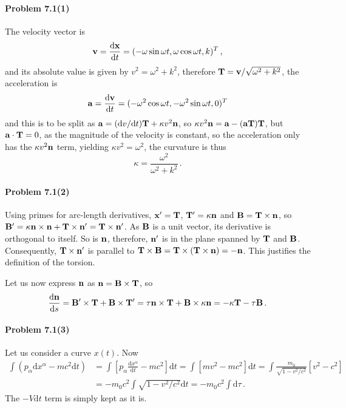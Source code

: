 \documentclass[a4paper,12pt]{article}
\def\d{\mathrm{d}}
\newcommand{\problem}[1]{\paragraph{Problem #1}}
\begin{document}

\problem{7.1(1)} The velocity vector is
\[
 {\bf v} = \frac{\d\bf x}{\d t} = (-\omega\sin\omega t, \omega\cos\omega t, k)^T\,,
\]
and its absolute value is given by $v^2 = \omega^2 + k^2$, therefore ${\bf T} = {\bf v}/\sqrt{\omega^2+k^2}$, the acceleration is
\[
 {\bf a} = \frac{\d\bf v}{\d t} = (-\omega^2\cos\omega t, -\omega^2 \sin\omega t, 0)^T
\]
and this is to be split as ${\bf a} = (\d v/\d t){\bf T} + \kappa v^2 {\bf n}$, so $\kappa v^2 {\bf n} = {\bf a} - ({\bf a}{\bf T}){\bf T}$, but ${\bf a}\cdot{\bf T} =0$, as the magnitude of the velocity is constant, so the acceleration only has the $\kappa v^2 {\bf n}$ term,
yielding $\kappa v^2=\omega^2$, the curvature is thus
\[
 \kappa = \frac{\omega^2}{\omega^2 + k^2}\,.
\]


\problem{7.1(2)} Using primes for arc-length derivatives,
${\bf x}' = {\bf T}$, ${\bf T}'=\kappa {\bf n}$ and
${\bf B} = {\bf T}\times {\bf n}$, so ${\bf B}'=\kappa {\bf n}\times {\bf n} + {\bf T}\times {\bf n}' ={\bf T}\times {\bf n}'$. As ${\bf B}$ is a unit vector, its derivative is orthogonal to itself. So is ${\bf n}$, therefore, ${\bf n}'$ is in the plane spanned by ${\bf T}$ and ${\bf B}$. Consequently, ${\bf T}\times {\bf n}'$ is parallel to ${\bf T}\times {\bf B} = {\bf T}\times ({\bf T}\times {\bf n}) = -{\bf n}$. This justifies the definition of the torsion.

Let us now express ${\bf n}$ as ${\bf n} = {\bf B}\times {\bf T}$, so
\[
 \frac{\d \bf n}{\d s} = {\bf B}'\times {\bf T} + {\bf B}\times {\bf T}' = \tau {\bf n}\times {\bf T} + {\bf B}\times \kappa {\bf n} = -\kappa {\bf T}-\tau{\bf B}\,.
\]


\problem{7.1(3)} Let us consider a curve $x(t)$. Now
\[\begin{aligned}
 \int (p_\alpha \d x^\alpha - m c^2 \d t) &= \int \left[ p_\alpha \frac{\d x^\alpha}{\d t} - mc^2\right]\d t = \int \left[ mv^2-mc^2\right]\d t = \int \frac{m_0}{\sqrt{1-v^2/c^2}}[v^2-c^2]\\ &= -m_0 c^2\int \sqrt{1-v^2/c^2}\d t = -m_0 c^2\int\d\tau\,.
\end{aligned}\]
The $-V\d t$ term is simply kept as it is.

\end{document}
